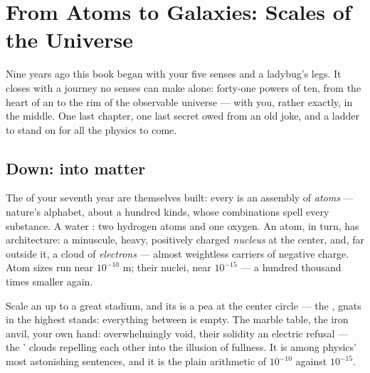 \chapter{From Atoms to Galaxies: Scales of the Universe}\label{ch:g9:atoms-to-galaxies}

Nine years ago this book began with your five senses and a
ladybug's legs. It closes with a journey no senses can make
alone: forty-one powers of ten, from the heart of an  to
the rim of the observable universe --- with you, rather
exactly, in the middle. One last chapter, one last secret owed
from an old joke, and a ladder to stand on for all the physics
to come.

\section{Down: into matter}

\begin{definition}[Atoms]\label{def:g9:atoms-to-galaxies:atom}
The  of your seventh year are themselves built:
every  is an assembly of \emph{atoms} ---
nature's alphabet, about a hundred kinds, whose combinations
spell every substance. A water : two hydrogen atoms
and one oxygen. An atom, in turn, has architecture: a
minuscule, heavy, positively charged
\emph{nucleus} at the center, and, far outside
it, a cloud of \emph{electrons} --- almost
weightless carriers of negative charge. Atom sizes run near
$10^{-10}$ \unit{m}; their nuclei, near $10^{-15}$ ---
a hundred thousand times smaller again.
\end{definition}

\begin{proposition}\label{prop:g9:atoms-to-galaxies:empty}
Scale an  up to a great stadium, and its  is a pea
at the center circle --- the , gnats in the highest
stands: everything between is empty. The marble table, the
iron anvil, your own hand: overwhelmingly void, their
solidity an electric refusal --- the '  clouds
repelling each other into the illusion of fullness. It is
among physics' most astonishing sentences, and it is the
plain arithmetic of $10^{-10}$ against $10^{-15}$.
\end{proposition}


